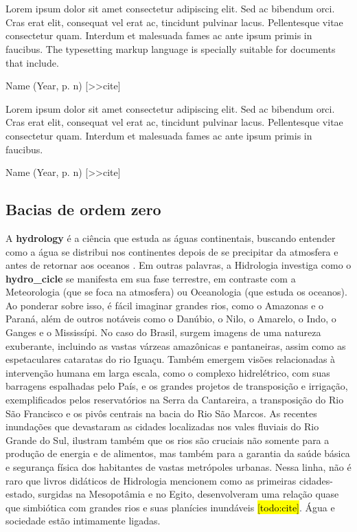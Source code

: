 \documentclass[./main.tex]{subfiles}
\begin{document}
\chapter{\chapHydro} \label{chap:hydrology}

\setlength{\parskip}{0mm}

\epigraph{\small{Lorem ipsum dolor sit amet consectetur adipiscing elit. Sed ac bibendum orci. Cras erat elit, consequat vel erat ac, tincidunt pulvinar lacus. Pellentesque vitae consectetur quam. Interdum et malesuada fames ac ante ipsum primis in faucibus. The typesetting markup language is specially suitable for documents that include.}}{Name (Year, p. n) [>>cite]}

\epigraph{\small{Lorem ipsum dolor sit amet consectetur adipiscing elit. Sed ac bibendum orci. Cras erat elit, consequat vel erat ac, tincidunt pulvinar lacus. Pellentesque vitae consectetur quam. Interdum et malesuada fames ac ante ipsum primis in faucibus.}}{Name (Year, p. n) [>>cite]}

\setlength{\parskip}{\myparskip}

\section{Bacias de ordem zero} \label{sec:hydro:intro}

\par A \textbf{\gls{hydrology}} é a ciência que estuda as águas continentais, buscando entender como a água se distribui nos continentes depois de se precipitar da atmosfera e antes de retornar aos oceanos \cite{chow1964}. Em outras palavras, a Hidrologia investiga como o \textbf{\gls{hydro_cicle}} se manifesta em sua fase terrestre, em contraste com a Meteorologia (que se foca na atmosfera) ou Oceanologia (que estuda os oceanos). Ao ponderar sobre isso, é fácil imaginar grandes rios, como o Amazonas e o Paraná, além de outros notáveis como o Danúbio, o Nilo, o Amarelo, o Indo, o Ganges e o Mississípi. No caso do Brasil, surgem imagens de uma natureza exuberante, incluindo as vastas várzeas amazônicas e pantaneiras, assim como as espetaculares cataratas do rio Iguaçu. Também emergem visões relacionadas à intervenção humana em larga escala, como o complexo hidrelétrico, com suas barragens espalhadas pelo País, e os grandes projetos de transposição e irrigação, exemplificados pelos reservatórios na Serra da Cantareira, a transposição do Rio São Francisco e os pivôs centrais na bacia do Rio São Marcos. As recentes inundações que devastaram as cidades localizadas nos vales fluviais do Rio Grande do Sul, ilustram também que os rios são cruciais não somente para a produção de energia e de alimentos, mas também para a garantia da saúde básica e segurança física dos habitantes de vastas metrópoles urbanas. Nessa linha, não é raro que livros didáticos de Hidrologia mencionem como as primeiras cidades-estado, surgidas na Mesopotâmia e no Egito, desenvolveram uma relação quase que simbiótica com grandes rios e suas planícies inundáveis \hl{[todo:cite]}. Água e sociedade estão intimamente ligadas. 
\end{document}

